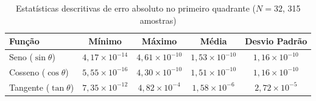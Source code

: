 \begin{table}[htbp]
\centering
\caption{Estatísticas descritivas de erro absoluto no primeiro quadrante ($N = 32$, 315 amostras)}
\label{tab:estatistica_32}
\begin{tabular}{lcccc}
\hline
Função & Mínimo & Máximo & Média & Desvio Padrão \\
\hline
Seno ($\sin\theta$) & $4,17 \times 10^{-14}$ & $4,61 \times 10^{-10}$ & $1,53 \times 10^{-10}$ & $1,16 \times 10^{-10}$ \\
Cosseno ($\cos\theta$) & $5,55 \times 10^{-16}$ & $4,30 \times 10^{-10}$ & $1,51 \times 10^{-10}$ & $1,16 \times 10^{-10}$ \\
Tangente ($\tan\theta$) & $7,35 \times 10^{-12}$ & $4,82 \times 10^{-4}$ & $1,58 \times 10^{-6}$ & $2,72 \times 10^{-5}$ \\
\hline
\end{tabular}
\end{table}